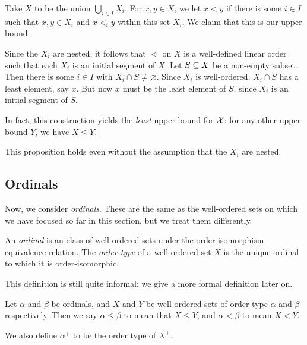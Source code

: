 \documentclass{article}
\begin{document}
\begin{prf}
    Take $X$ to be the union $\bigcup_{i \in I} X_i$. For $x, y \in X$, we let $x < y$ if there is some $i \in I$ such that $x, y \in X_i$ and $x <_i y$ within this set $X_i$. We claim that this is our upper bound.
    
    Since the $X_i$ are nested, it follows that $<$ on $X$ is a well-defined linear order such that each $X_i$ is an initial segment of $X$. Let $S \subseteq X$ be a non-empty subset. Then there is some $i \in I$ with $X_i \cap S \neq \varnothing$. Since $X_i$ is well-ordered, $X_i \cap S$ has a least element, say $x$. But now $x$ must be the least element of $S$, since $X_i$ is an initial segment of $S$.
\end{prf}

\begin{note}
	In fact, this construction yields the \textit{least} upper bound for $\mathcal{X}$: for any other upper bound $Y$, we have $X \leq Y$.
\end{note}

\begin{note}
	This proposition holds even without the assumption that the $X_i$ are nested. %
\end{note}


\subsection{Ordinals}
\label{section-ordinals-ordinals-intro}

Now, we consider \textit{ordinals}. These are the same as the well-ordered sets on which we have focused so far in this section, but we treat them differently.

\begin{definition}[Ordinal]
    An \textit{ordinal} is an class of well-ordered sets under the order-isomorphism equivalence relation. The \textit{order type} of a well-ordered set $X$ is the unique ordinal to which it is order-isomorphic.
\end{definition}

\begin{note}
	This definition is still quite informal: we give a more formal definition later on. %
\end{note}

\begin{definition}
    Let $\alpha$ and $\beta$ be ordinals, and $X$ and $Y$ be well-ordered sets of order type $\alpha$ and $\beta$ respectively. Then we say $\alpha \leq \beta$ to mean that $X \leq Y$, and $\alpha < \beta$ to mean $X < Y$.
    
    We also define $\alpha^+$ to be the order type of $X^+$.
\end{definition}
\end{document}
